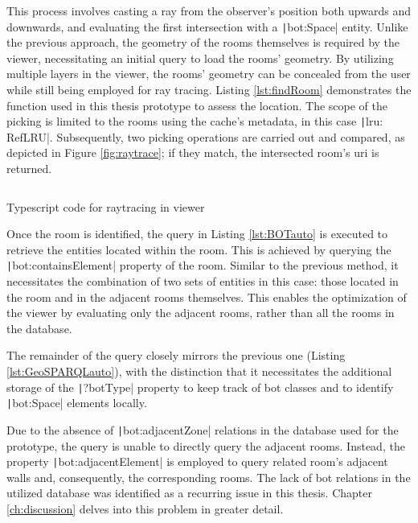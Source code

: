 This process involves casting a ray from the observer's position both upwards and downwards, and evaluating the first intersection with a \texttt|bot:Space| entity. Unlike the previous approach, the geometry of the rooms themselves is required by the viewer, necessitating an initial query to load the rooms' geometry. By utilizing multiple layers in the viewer, the rooms' geometry can be concealed from the user while still being employed for ray tracing. Listing \ref{lst:findRoom} demonstrates the function used in this thesis prototype to assess the location. The scope of the picking is limited to the rooms using the cache's metadata, in this case \texttt|lru: RefLRU|. Subsequently, two picking operations are carried out and compared, as depicted in Figure \ref{fig:raytrace}; if they match, the intersected room's \ac{uri} is returned.

\begin{listing}[h]
    \inputminted{ts}{dynamicQueries/inViewer/raytrace.ts}
    \vspace{-0.7cm}
    \caption{Typescript code for raytracing in viewer}
    \label{lst:findRoom}
\end{listing}

Once the room is identified, the query in Listing \ref{lst:BOTauto} is executed to retrieve the entities located within the room. This is achieved by querying the \texttt|bot:containsElement| property of the room. Similar to the previous method, it necessitates the combination of two sets of entities in this case: those located in the room and in the adjacent rooms themselves. This enables the optimization of the viewer by evaluating only the adjacent rooms, rather than all the rooms in the database.

The remainder of the query closely mirrors the previous one (Listing \ref{lst:GeoSPARQLauto}), with the distinction that it necessitates the additional storage of the \texttt|?botType| property to keep track of \ac{bot} classes and to identify \texttt|bot:Space| elements locally.

Due to the absence of \texttt|bot:adjacentZone| relations in the database used for the prototype, the query is unable to directly query the adjacent rooms. Instead, the property \texttt|bot:adjacentElement| is employed to query related room's adjacent walls and, consequently, the corresponding rooms. The lack of \ac{bot} relations in the utilized database was identified as a recurring issue in this thesis. Chapter \ref{ch:discussion} delves into this problem in greater detail.

